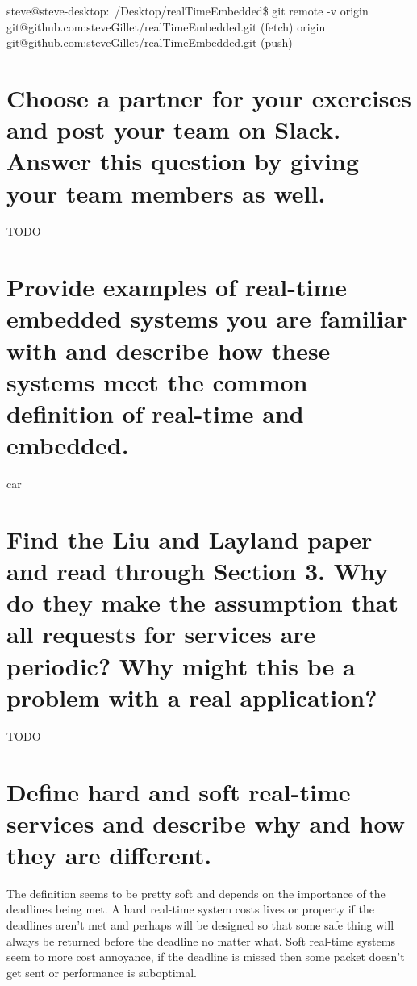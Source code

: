 \documentclass[12pt, letterpaper]{article}
\begin{document}
steve@steve-desktop:~/Desktop/realTimeEmbedded\$ git remote -v
origin  git@github.com:steveGillet/realTimeEmbedded.git (fetch)
origin  git@github.com:steveGillet/realTimeEmbedded.git (push)

\section{Choose a partner for your exercises and post your team on Slack. Answer this question by giving your
team members as well.}

TODO

\section{Provide examples of real-time embedded systems you are familiar with and describe how these
systems meet the common definition of real-time and embedded.}

car

\section{Find the Liu and Layland paper and read through Section 3. Why do they make the assumption that all
requests for services are periodic? Why might this be a problem with a real application?}

TODO

\section{Define hard and soft real-time services and describe why and how they are different.}

The definition seems to be pretty soft and depends on the importance of the deadlines being met.
A hard real-time system costs lives or property if the deadlines aren't met and perhaps will be designed so that some safe thing will always be returned before the deadline no matter what.
Soft real-time systems seem to more cost annoyance, if the deadline is missed then some packet doesn't get sent or performance is suboptimal.
\end{document}
